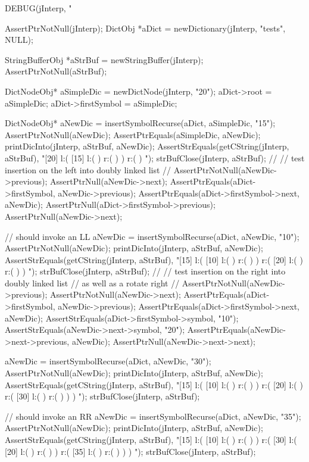 \startCTest
  DEBUG(jInterp, "\n%

  AssertPtrNotNull(jInterp);
  DictObj *aDict = newDictionary(jInterp, "tests", NULL);

  StringBufferObj *aStrBuf = newStringBuffer(jInterp);
  AssertPtrNotNull(aStrBuf);
  
  DictNodeObj* aSimpleDic = newDictNode(jInterp, "20");
  aDict->root             = aSimpleDic;
  aDict->firstSymbol      = aSimpleDic;

  DictNodeObj* aNewDic = insertSymbolRecurse(aDict, aSimpleDic, "15");
  AssertPtrNotNull(aNewDic);
  AssertPtrEquals(aSimpleDic, aNewDic);
  printDicInto(jInterp, aStrBuf, aNewDic);
  AssertStrEquals(getCString(jInterp, aStrBuf),
  "[20] l:( [15] l:(  ) r:(  )  ) r:(  ) ");
  strBufClose(jInterp, aStrBuf);
  //
  // test insertion on the left into doubly linked list
  //
  AssertPtrNotNull(aNewDic->previous);
  AssertPtrNull(aNewDic->next);
  AssertPtrEquals(aDict->firstSymbol, aNewDic->previous);
  AssertPtrEquals(aDict->firstSymbol->next, aNewDic);
  AssertPtrNull(aDict->firstSymbol->previous);
  AssertPtrNull(aNewDic->next);

  // should invoke an LL
  aNewDic = insertSymbolRecurse(aDict, aNewDic, "10");
  AssertPtrNotNull(aNewDic);
  printDicInto(jInterp, aStrBuf, aNewDic);
  AssertStrEquals(getCString(jInterp, aStrBuf),
  "[15] l:( [10] l:(  ) r:(  )  ) r:( [20] l:(  ) r:(  )  ) ");
  strBufClose(jInterp, aStrBuf);
  //
  // test insertion on the right into doubly linked list
  // as well as a rotate right
  //
  AssertPtrNotNull(aNewDic->previous);
  AssertPtrNotNull(aNewDic->next);
  AssertPtrEquals(aDict->firstSymbol, aNewDic->previous);
  AssertPtrEquals(aDict->firstSymbol->next, aNewDic);
  AssertStrEquals(aDict->firstSymbol->symbol, "10");
  AssertStrEquals(aNewDic->next->symbol, "20");
  AssertPtrEquals(aNewDic->next->previous, aNewDic);
  AssertPtrNull(aNewDic->next->next);

  aNewDic = insertSymbolRecurse(aDict, aNewDic, "30");
  AssertPtrNotNull(aNewDic);
  printDicInto(jInterp, aStrBuf, aNewDic);
  AssertStrEquals(getCString(jInterp, aStrBuf),
  "[15] l:( [10] l:(  ) r:(  )  ) r:( [20] l:(  ) r:( [30] l:(  ) r:(  )  )  ) ");
  strBufClose(jInterp, aStrBuf);
  
  // should invoke an RR
  aNewDic = insertSymbolRecurse(aDict, aNewDic, "35");
  AssertPtrNotNull(aNewDic);
  printDicInto(jInterp, aStrBuf, aNewDic);
  AssertStrEquals(getCString(jInterp, aStrBuf),
  "[15] l:( [10] l:(  ) r:(  )  ) r:( [30] l:( [20] l:(  ) r:(  )  ) r:( [35] l:(  ) r:(  )  )  ) ");
  strBufClose(jInterp, aStrBuf);

